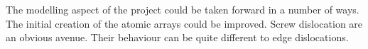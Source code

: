 The modelling aspect of the project could be taken forward in a number of ways. The initial creation of the atomic arrays could be improved. Screw dislocation are an obvious avenue. Their behaviour can be quite different to edge dislocations.
































































































































